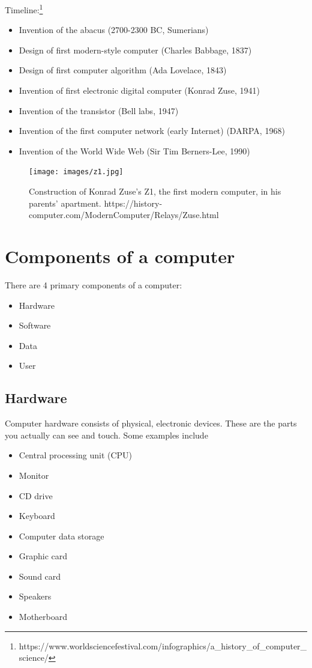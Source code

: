 Timeline:\footnote{https://www.worldsciencefestival.com/infographics/a\_history\_of\_computer\_science/}
\begin{itemize}
\item Invention of the abacus (2700-2300 BC, Sumerians)
\item Design of first modern-style computer (Charles Babbage, 1837)
\item Design of first computer algorithm (Ada Lovelace, 1843)
\item Invention of first electronic digital computer (Konrad Zuse, 1941)
\item Invention of the transistor (Bell labs, 1947)
\item Invention of the first computer network (early Internet) (DARPA, 1968)
\item Invention of the World Wide Web (Sir Tim Berners-Lee, 1990)
\end{itemize}

\begin{figure}
	\centering
	\texttt{[image: images/z1.jpg]}
	\caption{Construction of Konrad Zuse's Z1, the first modern computer, in his
    parents' apartment.
    https://history-computer.com/ModernComputer/Relays/Zuse.html}
	\label{fig:z1}
\end{figure}

\section{Components of a computer}

There are 4 primary components of a computer:

\begin{itemize}
	\item Hardware
	\item Software
	\item Data
	\item User
\end{itemize}

\subsection{Hardware}

Computer hardware consists of physical, electronic devices. These are the parts you actually can see and touch. Some examples include

\begin{itemize}
	\item Central processing unit (CPU)
	\item Monitor
	\item CD drive
	\item Keyboard
	\item Computer data storage
	\item Graphic card
	\item Sound card
	\item Speakers
	\item Motherboard
\end{itemize}

